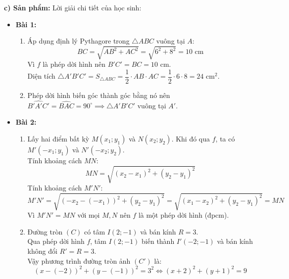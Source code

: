 \documentclass[12pt, a4paper]{article}
\begin{document}
\textbf{c) Sản phẩm:} Lời giải chi tiết của học sinh:
\begin{itemize}[leftmargin=0.6cm]
    \item \textbf{Bài 1:}
    \begin{enumerate}[leftmargin=0.5cm]
        \item Áp dụng định lý Pythagore trong $\triangle ABC$ vuông tại $A$:
        $$BC = \sqrt{AB^2 + AC^2} = \sqrt{6^2 + 8^2} = 10\text{ cm}$$
        Vì $f$ là phép dời hình nên $B'C' = BC = 10\text{ cm}$.\\
        Diện tích $\triangle A'B'C' = S_{\triangle ABC} = \dfrac{1}{2} \cdot AB \cdot AC = \dfrac{1}{2} \cdot 6 \cdot 8 = 24\text{ cm}^2$.
        \item Phép dời hình biến góc thành góc bằng nó nên $\widehat{B'A'C'} = \widehat{BAC} = 90^\circ \implies \triangle A'B'C'$ vuông tại $A'$.
    \end{enumerate}
    \item \textbf{Bài 2:}
    \begin{enumerate}[leftmargin=0.5cm]
        \item Lấy hai điểm bất kỳ $M(x_1; y_1)$ và $N(x_2; y_2)$. Khi đó qua $f$, ta có $M'(-x_1; y_1)$ và $N'(-x_2; y_2)$.\\
        Tính khoảng cách $MN$:
        $$MN = \sqrt{(x_2 - x_1)^2 + (y_2 - y_1)^2}$$
        Tính khoảng cách $M'N'$:
        $$M'N' = \sqrt{(-x_2 - (-x_1))^2 + (y_2 - y_1)^2} = \sqrt{(x_1 - x_2)^2 + (y_2 - y_1)^2} = MN$$
        Vì $M'N' = MN$ với mọi $M, N$ nên $f$ là một phép dời hình (đpcm).
        \item Đường tròn $(C)$ có tâm $I(2; -1)$ và bán kính $R = 3$.\\
        Qua phép dời hình $f$, tâm $I(2; -1)$ biến thành $I'(-2; -1)$ và bán kính không đổi $R' = R = 3$.\\
        Vậy phương trình đường tròn ảnh $(C')$ là:
        $$(x - (-2))^2 + (y - (-1))^2 = 3^2 \iff (x + 2)^2 + (y + 1)^2 = 9$$
    \end{enumerate}
\end{itemize}
\end{document}
